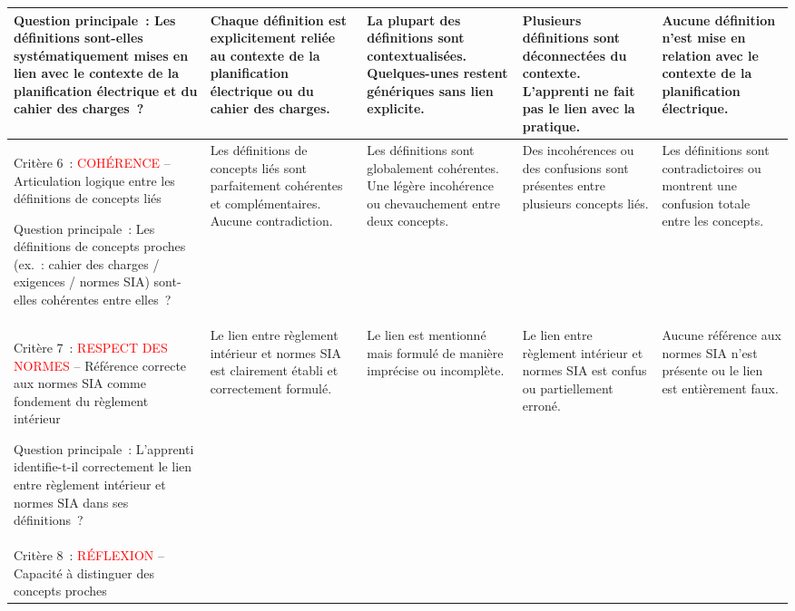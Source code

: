 \documentclass[a4paper,12pt,answers,addpoints]{exam}
\begin{document}
\begin{longtable}{|p{}|p{}|p{}|p{}|p{}|}
		\smallskip
		Question principale~: Les définitions sont-elles systématiquement mises en lien avec le contexte de la planification électrique et du cahier des charges~?
		&
		Chaque définition est explicitement reliée au contexte de la planification électrique ou du cahier des charges.
		&
		La plupart des définitions sont contextualisées. Quelques-unes restent génériques sans lien explicite.
		&
		Plusieurs définitions sont déconnectées du contexte. L'apprenti ne fait pas le lien avec la pratique.
		&
		Aucune définition n'est mise en relation avec le contexte de la planification électrique. \\
		\hline
		Critère 6~: \textcolor{red}{COHÉRENCE} -- Articulation logique entre les définitions de concepts liés
		
		\smallskip
		Question principale~: Les définitions de concepts proches (ex.~: cahier des charges / exigences / normes SIA) sont-elles cohérentes entre elles~?
		&
		Les définitions de concepts liés sont parfaitement cohérentes et complémentaires. Aucune contradiction.
		&
		Les définitions sont globalement cohérentes. Une légère incohérence ou chevauchement entre deux concepts.
		&
		Des incohérences ou des confusions sont présentes entre plusieurs concepts liés.
		&
		Les définitions sont contradictoires ou montrent une confusion totale entre les concepts. \\
		\hline
		Critère 7~: \textcolor{red}{RESPECT DES NORMES} -- Référence correcte aux normes SIA comme fondement du règlement intérieur
		
		\smallskip
		Question principale~: L'apprenti identifie-t-il correctement le lien entre règlement intérieur et normes SIA dans ses définitions~?
		&
		Le lien entre règlement intérieur et normes SIA est clairement établi et correctement formulé.
		&
		Le lien est mentionné mais formulé de manière imprécise ou incomplète.
		&
		Le lien entre règlement intérieur et normes SIA est confus ou partiellement erroné.
		&
		Aucune référence aux normes SIA n'est présente ou le lien est entièrement faux. \\
		\hline
		Critère 8~: \textcolor{red}{RÉFLEXION} -- Capacité à distinguer des concepts proches
		

\end{longtable}
\end{document}
